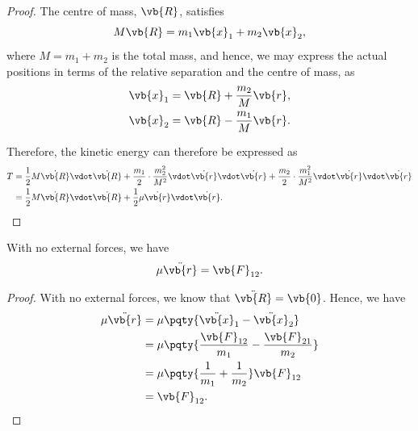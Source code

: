 \begin{proof}
    The centre of mass, \(\vb{R}\), satisfies
    \begin{equation}
        M \vb{R} = m_1 \vb{x}_1 + m_2 \vb{x}_2,
    \end{equation}
    where \(M = m_1 + m_2\) is the total mass, and hence, we may express the actual positions in terms of the relative separation and the centre of mass, as
    \begin{subequations}\begin{align}
        \vb{x}_1 &= \vb{R} + \frac{m_2}{M} \vb{r}, \\
        \vb{x}_2 &= \vb{R} - \frac{m_1}{M} \vb{r}.
    \end{align}\end{subequations}

    Therefore, the kinetic energy can therefore be expressed as
    \begin{subequations}\begin{align}
        T &= \frac{1}{2} M \dot{\vb{R}} \vdot \dot{\vb{R}} + \frac{m_1}{2} \cdot \frac{m_2^2}{M^2} \vdot \dot{\vb{r}} \vdot \dot{\vb{r}} + \frac{m_2}{2} \cdot \frac{m_1^2}{M^2} \vdot \dot{\vb{r}} \vdot \dot{\vb{r}} \\
        &= \frac{1}{2} M \dot{\vb{R}} \vdot \dot{\vb{R}} + \frac{1}{2} \mu \dot{\vb{r}} \vdot \dot{\vb{r}}.
    \end{align}\end{subequations}
\end{proof}

\begin{proposition}
    \label{prop:rel-sep-obj-red-mass}%
    With no external forces, we have
    \begin{equation}
        \mu \ddot{\vb{r}} = \vb{F}_{12}.
    \end{equation}
\end{proposition}

\begin{proof}
    With no external forces, we know that \(\ddot{\vb{R}} = \vb{0}\). Hence, we have
    \begin{subequations}\begin{align}
        \mu \ddot{\vb{r}} &= \mu \pqty{\ddot{\vb{x}}_1 - \ddot{\vb{x}}_2} \\
        &= \mu \pqty{\frac{\vb{F}_{12}}{m_1} - \frac{\vb{F}_{21}}{m_2}} \\
        &= \mu \pqty{\frac{1}{m_1} + \frac{1}{m_2}} \vb{F}_{12} \\
        &= \vb{F}_{12}.
    \end{align}\end{subequations}
\end{proof}

